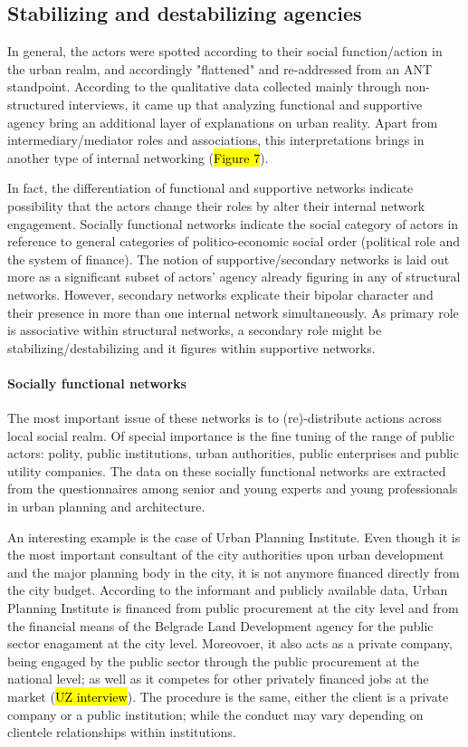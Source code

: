 \documentclass[11pt]{report}
\begin{document}
\subsection{Stabilizing and destabilizing agencies}

In general, the actors were spotted according to their social function/action in the urban realm, and accordingly "flattened" and re-addressed from an ANT standpoint.
According to the qualitative data collected mainly through non-structured interviews, it came up that analyzing functional and supportive agency bring an additional layer of explanations on urban reality.
Apart from intermediary/mediator roles and associations, this interpretations brings in another type of internal networking (\hl{Figure 7}).

In fact, the differentiation of functional and supportive networks indicate possibility that the actors change their roles by alter their internal network engagement.
Socially functional networks indicate the social category of actors in reference to general categories of politico-economic social order (political role and the system of finance).
The notion of supportive/secondary networks is laid out more as a significant subset of actors' agency already figuring in any of structural networks.
However, secondary networks explicate their bipolar character and their presence in more than one internal network simultaneously.
As primary role is associative within structural networks, a secondary role might be stabilizing/destabilizing and it figures within supportive networks. 

\paragraph{Socially functional networks}

The most important issue of these networks is to (re)-distribute actions across local social realm.
Of special importance is the fine tuning of the range of public actors: polity, public institutions, urban authorities, public enterprises and public utility companies.
The data on these socially functional networks are extracted from the questionnaires among senior and young experts and young professionals in urban planning and architecture. 

An interesting example is the case of Urban Planning Institute. Even though it is the most important consultant of the city authorities upon urban development and the major planning body in the city, it is not anymore financed directly from the city budget.
According to the informant and publicly available data, Urban Planning Institute is financed from public procurement at the city level and from the financial means of the Belgrade Land Development agency for the public sector enagament at the city level.
Moreovoer, it also acts as a private company, being engaged by the public sector through the public procurement at the national level; as well as it competes for other privately financed jobs at the market (\hl{UZ interview}).
The procedure is the same, either the client is a private company or a public institution; while the conduct may vary depending on clientele relationships within institutions.
\end{document}
